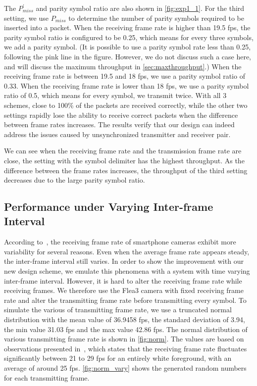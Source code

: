 The $P_{miss}^ \prime$ and parity symbol ratio are also shown in \autoref{fig:exp1_1}. 
For the third setting, we use $P_{miss}$ to determine the number of parity symbols required to be inserted into a packet. When the receiving frame rate is higher than 19.5 fps, the parity symbol ratio is configured to be 0.25, which means for every three symbols, we add a parity symbol. (It is possible to use a parity symbol rate less than 0.25, following the pink line in the figure. However, we do not discuss such a case here, and will discuss the maximum throughput in \autoref{sec:maxthroughput}.) When the receiving frame rate is between 19.5 and 18 fps, we use a parity symbol ratio of 0.33. When the receiving frame rate is lower than 18 fps, we use a parity symbol ratio of 0.5, which means for every symbol, we transmit twice.
With all 3 schemes, close to 100\% of the packets are received correctly, while the other two settings rapidly lose the ability to receive correct packets when the difference between frame rates increases. The results verify that our design can indeed address the issues caused by unsynchronized transmitter and receiver pair. 

We can see when the receiving frame rate and the transmission frame rate are close, the setting with the symbol delimiter has the highest throughput. As the difference between the frame rates increases, the throughput of the third setting decreases due to the large parity symbol ratio.

\subsection{Performance under Varying Inter-frame Interval}
According to~\cite{hu2013lightsync}, the receiving frame rate of smartphone cameras exhibit more variability for several reasons. Even when the average frame rate appears steady, the inter-frame interval still varies. 
In order to show the improvement with our new design scheme, we emulate this phenomena with a system with time varying inter-frame interval. 
However, it is hard to alter the receiving frame rate while receiving frames. We therefore use the Flea3 camera with fixed receiving frame rate and alter the transmitting frame rate before transmitting every symbol. 
To simulate the various of transmitting frame rate, we use a truncated normal distribution with the mean value of 36.9458 fps, the standard deviation of 3.94, the min value 31.03 fps and the max value 42.86 fps. 
The normal distribution of various transmitting frame rate is shown in \autoref{fig:norm}. 
The values are based on observations presented in~\cite{hu2013lightsync}, which states that the receiving frame rate fluctuates significantly between 21 to 29 fps for an entirely white foreground, with an average of around 25 fps. \autoref{fig:norm_vary} shows the generated random numbers for each transmitting frame.

